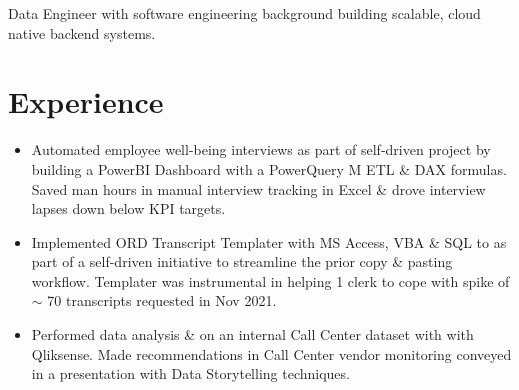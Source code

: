 %
%


\fancyhead{} %


Data Engineer with software engineering background building scalable, cloud native backend systems.

\section{Experience}
\begin{itemize}
  \item Automated employee well-being interviews as part of self-driven project by
    building a PowerBI Dashboard with a PowerQuery M ETL \& DAX formulas. Saved man hours
    in manual interview tracking in Excel \& drove interview lapses down below KPI targets.

  \item Implemented ORD Transcript Templater with MS Access, VBA \& SQL to as part
    of a self-driven initiative to streamline the prior copy \& pasting workflow.
    Templater was instrumental in helping 1 clerk to cope with spike of $\sim$ 
    70 transcripts requested in Nov 2021.

  \item Performed data analysis \& on an internal Call Center dataset with
    with Qliksense. Made recommendations in Call Center vendor monitoring 
    conveyed in a presentation with Data Storytelling techniques.
\end{itemize}

